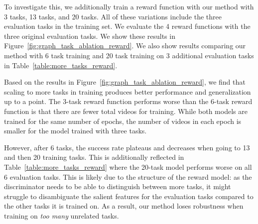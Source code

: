 To investigate this, we additionally train a reward function with our method with 3 tasks, 13 tasks, and 20 tasks. All of these variations include the three evaluation tasks in the training set. We evaluate the 4 reward functions with the three original evaluation tasks. We show these results in Figure~\ref{fig:graph_task_ablation_reward}. We also show results comparing our method with 6 task training and 20 task training on 3 additional evaluation tasks in Table~\ref{table:more_tasks_reward}.

Based on the results in Figure~\ref{fig:graph_task_ablation_reward}, we find that scaling to more tasks in training produces better performance and generalization up to a point. The 3-task reward function performs worse than the 6-task reward function is that there are fewer total videos for training. While both models are trained for the same number of epochs, the number of videos in each epoch is smaller for the model trained with three tasks.

However, after 6 tasks, the success rate plateaus and decreases when going to 13 and then 20 training tasks. This is additionally reflected in Table~\ref{table:more_tasks_reward} where the 20-task model performs worse on all 6 evaluation tasks. This is likely due to the structure of the reward model: as the discriminator needs to be able to distinguish between more tasks, it might struggle to disambiguate the salient features for the evaluation tasks compared to the other tasks it is trained on. As a result, our method loses robustness when training on \textit{too many} unrelated tasks.
